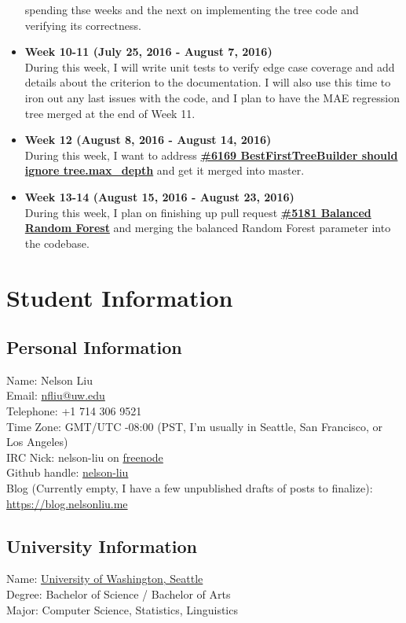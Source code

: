 \documentclass[12pt, oneside]{article}
\begin{document}
\begin{itemize}
  spending thse weeks and the next on implementing the tree code and
  verifying its correctness.
  \item \textbf{Week 10-11 (July 25, 2016 - August 7, 2016)}\\
  During this week, I will write unit tests to verify edge case
  coverage and add details about the criterion to the documentation. I
  will also use this time to iron out any last issues with the code,
  and I plan to have the MAE regression tree merged at the end of Week
  11.
  \item \textbf{Week 12 (August 8, 2016 - August 14, 2016)}\\
  During this week, I want to address
  \textbf{\href{https://github.com/scikit-learn/scikit-learn/pull/6169}
    {\#6169 BestFirstTreeBuilder should ignore tree.max\_depth}} and
  get it merged into master.
  \item
  \textbf{Week 13-14 (August 15, 2016 - August 23, 2016)}\\
  During this week, I plan on finishing up pull request
  \textbf{\href{https://github.com/scikit-learn/scikit-learn/pull/5181}
    {\#5181 Balanced Random Forest}} and merging the balanced Random
  Forest parameter into the codebase.

\end{itemize}
\section{Student Information}
\subsection{Personal Information}
Name: Nelson Liu\\
Email: \href{mailto:nfliu@uw.edu}{nfliu@uw.edu}\\
Telephone: +1 714 306 9521\\
Time Zone: GMT/UTC -08:00 (PST, I'm usually in Seattle, San Francisco,
or Los Angeles)\\
IRC Nick: nelson-liu on \href{https://webchat.freenode.net/}{freenode}\\
Github handle: \href{https://github.com/nelson-liu}{nelson-liu}\\
Blog (Currently empty, I have a few unpublished drafts of posts to finalize):
\href{http://blog.nelsonliu.me}{https://blog.nelsonliu.me}\\
\subsection{University Information}
Name: \href{http://www.washington.edu/}{University of Washington, Seattle}\\
Degree: Bachelor of Science / Bachelor of Arts\\
Major: Computer Science, Statistics, Linguistics
\end{document}
